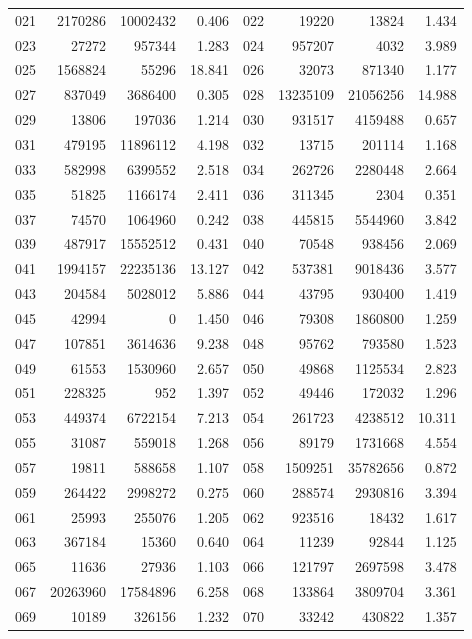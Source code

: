 \begin{longtable}{lrrr@{\hspace{16bp}}lrrr}
021 & 2170286 & 10002432 & 0.406 & 022 & 19220 & 13824 & 1.434\\
023 & 27272 & 957344 & 1.283 & 024 & 957207 & 4032 & 3.989\\
025 & 1568824 & 55296 & 18.841 & 026 & 32073 & 871340 & 1.177\\
027 & 837049 & 3686400 & 0.305 & 028 & 13235109 & 21056256 & 14.988\\
029 & 13806 & 197036 & 1.214 & 030 & 931517 & 4159488 & 0.657\\
031 & 479195 & 11896112 & 4.198 & 032 & 13715 & 201114 & 1.168\\
033 & 582998 & 6399552 & 2.518 & 034 & 262726 & 2280448 & 2.664\\
035 & 51825 & 1166174 & 2.411 & 036 & 311345 & 2304 & 0.351\\
037 & 74570 & 1064960 & 0.242 & 038 & 445815 & 5544960 & 3.842\\
039 & 487917 & 15552512 & 0.431 & 040 & 70548 & 938456 & 2.069\\
041 & 1994157 & 22235136 & 13.127 & 042 & 537381 & 9018436 & 3.577\\
043 & 204584 & 5028012 & 5.886 & 044 & 43795 & 930400 & 1.419\\
045 & 42994 & 0 & 1.450 & 046 & 79308 & 1860800 & 1.259\\
047 & 107851 & 3614636 & 9.238 & 048 & 95762 & 793580 & 1.523\\
049 & 61553 & 1530960 & 2.657 & 050 & 49868 & 1125534 & 2.823\\
051 & 228325 & 952 & 1.397 & 052 & 49446 & 172032 & 1.296\\
053 & 449374 & 6722154 & 7.213 & 054 & 261723 & 4238512 & 10.311\\
055 & 31087 & 559018 & 1.268 & 056 & 89179 & 1731668 & 4.554\\
057 & 19811 & 588658 & 1.107 & 058 & 1509251 & 35782656 & 0.872\\
059 & 264422 & 2998272 & 0.275 & 060 & 288574 & 2930816 & 3.394\\
061 & 25993 & 255076 & 1.205 & 062 & 923516 & 18432 & 1.617\\
063 & 367184 & 15360 & 0.640 & 064 & 11239 & 92844 & 1.125\\
065 & 11636 & 27936 & 1.103 & 066 & 121797 & 2697598 & 3.478\\
067 & 20263960 & 17584896 & 6.258 & 068 & 133864 & 3809704 & 3.361\\
069 & 10189 & 326156 & 1.232 & 070 & 33242 & 430822 & 1.357\\

\end{longtable}
